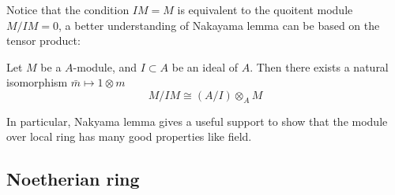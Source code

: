 Notice that the condition \(IM = M\) is equivalent to the quoitent module \(M/IM = 0\), a better understanding of Nakayama lemma can be based on the tensor product:
\begin{lemma}
    Let \(M\) be a \(A\)-module, and \(I \subset A\) be an ideal of \(A\). Then there exists a natural isomorphism \(\bar{m} \mapsto 1 \otimes m\)
    \[M/IM \cong (A/I) \otimes_A M\]
\end{lemma}

In particular, Nakyama lemma gives a useful support to show that the module over local ring has many good properties like field.



\subsection{Noetherian ring}

